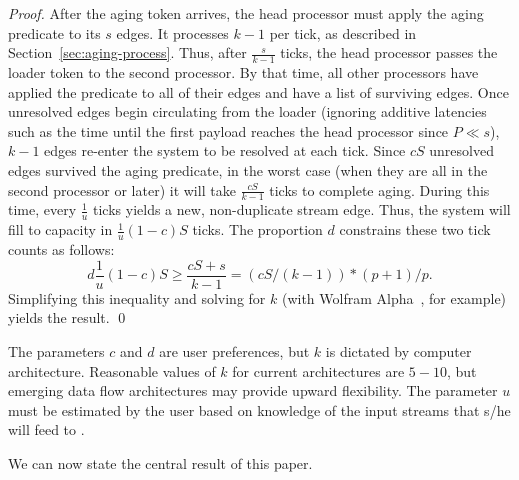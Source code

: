 \begin{proof}
After the aging token arrives, the head processor must apply the aging predicate
to its $s$ edges.  It processes $k-1$ per tick, as described in Section~\ref{sec:aging-process}.
Thus, after $\frac{s}{k-1}$ ticks, the head processor passes the loader token to the
second processor. By that time, all other processors have applied the predicate to
all of their edges and have a list of surviving edges.
Once unresolved edges begin circulating from
the loader (ignoring additive latencies such as the time until the first
payload reaches the head processor since $P \ll s$), $k-1$ edges re-enter the system to be
resolved at each
tick.  Since $cS$ unresolved edges survived the aging predicate, in the worst case
(when they are all in the second processor or later) it will take
$\frac{cS}{k-1}$ ticks to complete aging. During this time, every $\frac{1}{u}$
ticks yields a new, non-duplicate stream edge. Thus, the system will fill
to capacity in $\frac{1}{u} (1-c)S$ ticks.
The proportion $d$ constrains these two tick counts as follows:
\[ d \frac{1}{u} (1-c) S \ge \frac{cS + s}{k-1} = (cS / (k-1)) * (p+1)/p.\]
Simplifying this inequality and solving for $k$ (with Wolfram Alpha~\cite{wa},
for example)
yields the result. \qed
\end{proof}

The parameters $c$ and $d$ are user preferences, but $k$ is dictated by 
computer architecture.  Reasonable values of $k$ for current architectures are
$5-10$, but emerging data flow architectures may provide upward flexibility.
The parameter $u$ must be estimated by the user based on knowledge of the
input streams that s/he will feed to \XSCCns.


We can now state the central result of this paper. 

